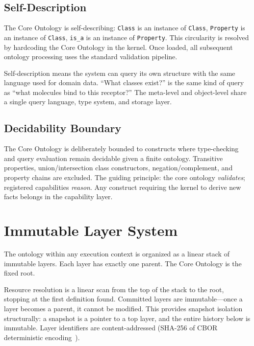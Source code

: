 \documentclass[10pt,twocolumn,letterpaper]{article}
\newcommand{\code}[1]{\texttt{\small #1}}
\begin{document}
\subsection{Self-Description}

The Core Ontology is self-describing: \code{Class} is an instance of \code{Class}, \code{Property} is an instance of \code{Class}, \code{is\_a} is an instance of \code{Property}.
This circularity is resolved by hardcoding the Core Ontology in the kernel.
Once loaded, all subsequent ontology processing uses the standard validation pipeline.

Self-description means the system can query its own structure with the same language used for domain data.
``What classes exist?'' is the same kind of query as ``what molecules bind to this receptor?''
The meta-level and object-level share a single query language, type system, and storage layer.

\subsection{Decidability Boundary}

The Core Ontology is deliberately bounded to constructs where type-checking and query evaluation remain decidable given a finite ontology.
Transitive properties, union/intersection class constructors, negation/complement, and property chains are excluded.
The guiding principle: the core ontology \emph{validates}; registered capabilities \emph{reason}.
Any construct requiring the kernel to derive new facts belongs in the capability layer.


\section{Immutable Layer System}
\label{sec:layers}

The ontology within any execution context is organized as a linear stack of immutable layers.
Each layer has exactly one parent.
The Core Ontology is the fixed root.

Resource resolution is a linear scan from the top of the stack to the root, stopping at the first definition found.
Committed layers are immutable---once a layer becomes a parent, it cannot be modified.
This provides snapshot isolation structurally: a snapshot is a pointer to a top layer, and the entire history below is immutable.
Layer identifiers are content-addressed (SHA-256 of CBOR deterministic encoding~\cite{rfc8949}).
\end{document}
